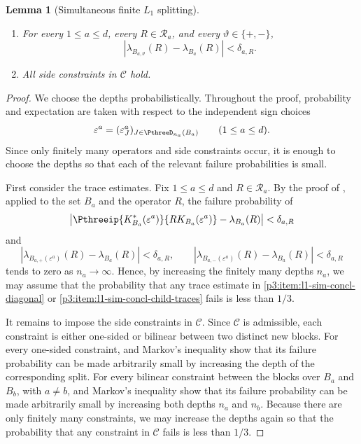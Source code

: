 \documentclass[11pt,reqno]{amsart}
\makeatletter
\theoremstyle{plain}
\newtheorem{lemma}[lemma]{Lemma}
\theoremstyle{definition}
\newcounter{problempaper}
\newenvironment{problempaperbody}{%
  \setcounter{subsection}{0}%
  \setcounter{subsubsection}{0}%
  \setcounter{paragraph}{0}%
  \renewcommand{\thesubsection}{\arabic{subsection}}%
  \renewcommand{\thesubsubsection}{\thesubsection.\arabic{subsubsection}}%
  \renewcommand{\theparagraph}{\thesubsubsection.\arabic{paragraph}}%
  \let\problem@outersection\section
  \let\problem@outersubsection\subsection
  \let\problem@outersubsubsection\subsubsection
  \let\problem@outerparagraph\paragraph
  \let\section\problem@papersection
  \let\subsection\problem@papersubsection
  \let\subsubsection\problem@papersubsubsection
}{%
  \let\section\problem@outersection
  \let\subsection\problem@outersubsection
  \let\subsubsection\problem@outersubsubsection
  \let\paragraph\problem@outerparagraph
}
\newcommand{\problem@target}[2]{%
  \hypertarget{problem-\theproblempaper-#1-#2}{}%
}
\newcommand{\problem@paperheading}[3]{%
  \par\bigskip
  \problem@target{#1}{#2}%
  \noindent{\large\bfseries #2.\quad #3\par}%
  \nobreak\smallskip
}
\newcommand{\problem@papersubheading}[3]{%
  \par\medskip
  \problem@target{#1}{#2}%
  \noindent{\normalsize\bfseries #2.\quad #3\par}%
  \nobreak\smallskip
}
\newcommand{\problem@papersubsubheading}[3]{%
  \par\smallskip
  \problem@target{#1}{#2}%
  \noindent{\normalsize\itshape #2.\quad #3.\ }%
}
\def\problem@papersection{%
  \@ifstar{\problem@papersectionstar}{\problem@papersectionnostar}%
}
\def\problem@papersectionstar#1{%
  \par\bigskip\noindent{\large\bfseries #1\par}\nobreak\smallskip
}
\def\problem@papersectionnostar#1{%
  \refstepcounter{subsection}%
  \setcounter{subsubsection}{0}%
  \setcounter{paragraph}{0}%
  \problem@paperheading{section}{\thesubsection}{#1}%
  \problem@writecontentsline{section}{\thesubsection}{#1}%
}
\def\problem@papersubsection{%
  \@ifstar{\problem@papersubsectionstar}{\problem@papersubsectionnostar}%
}
\def\problem@papersubsectionstar#1{%
  \par\medskip\noindent{\normalsize\bfseries #1\par}\nobreak\smallskip
}
\def\problem@papersubsectionnostar#1{%
  \refstepcounter{subsubsection}%
  \setcounter{paragraph}{0}%
  \problem@papersubheading{subsection}{\thesubsubsection}{#1}%
  \problem@writecontentsline{subsection}{\thesubsubsection}{#1}%
}
\def\problem@papersubsubsection{%
  \@ifstar{\problem@papersubsubsectionstar}{\problem@papersubsubsectionnostar}%
}
\def\problem@papersubsubsectionstar#1{%
  \par\smallskip\noindent{\normalsize\itshape #1.\ }%
}
\def\problem@papersubsubsectionnostar#1{%
  \refstepcounter{paragraph}%
  \problem@papersubsubheading{subsubsection}{\theparagraph}{#1}%
  \problem@writecontentsline{subsubsection}{\theparagraph}{#1}%
}
\newcommand{\problem@writecontentsline}[3]{%
  \begingroup
  \protected@write\@auxout{}{%
    \string\problemcontentsentry{\theproblempaper}{#1}{#2}{#3}{\thepage}%
  }%
  \endgroup
}
\newcommand{\problemcontentsentry}[5]{%
  \@ifundefined{problemcontents@#1}{%
    \expandafter\gdef\csname problemcontents@#1\endcsname{}%
  }{}%
  \expandafter\g@addto@macro\csname problemcontents@#1\endcsname{%
    \problemcontentsline{#1}{#2}{#3}{#4}{#5}%
  }%
}
\newcommand{\problemcontentslink}[4]{%
  \hyperlink{problem-#1-#2-#3}{#4}%
}
\newcommand{\problemcontentsline}[5]{%
  \ifstrequal{#2}{section}{%
    \par\noindent
    \problemcontentslink{#1}{#2}{#3}{\makebox[2.5em][l]{#3}#4}%
    \nobreak\dotfill
    \problemcontentslink{#1}{#2}{#3}{#5}\par
  }{%
    \ifstrequal{#2}{subsection}{%
      \par\noindent\hspace*{1.5em}%
      \problemcontentslink{#1}{#2}{#3}{\makebox[3.5em][l]{#3}#4}%
      \nobreak\dotfill
      \problemcontentslink{#1}{#2}{#3}{#5}\par
    }{%
      \par\noindent\hspace*{3em}%
      \problemcontentslink{#1}{#2}{#3}{\makebox[4.5em][l]{#3}#4}%
      \nobreak\dotfill
      \problemcontentslink{#1}{#2}{#3}{#5}\par
    }%
  }%
}
\makeatother
\begin{document}
\begin{problempaperbody}
\begin{lemma}[Simultaneous finite $L_1$ splitting]
\begin{enumerate}[label=\textup{(\roman*)}]
\item \label{p3:item:l1-sim-concl-child-traces} For every $1\leq a\leq d$, every $R\in\mathcal R_a$, and every $\vartheta\in\{+,-\}$,
\begin{equation*}
        |\lambda_{B_{a,\vartheta}}(R)-\lambda_{B_a}(R)|<\delta_{a,R}.
\end{equation*}

\item \label{p3:item:l1-sim-concl-side} All side constraints in $\mathscr C$ hold.
\end{enumerate}
\end{lemma}

\begin{proof}
We choose the depths probabilistically. Throughout the proof, probability and expectation are taken with respect to the independent sign choices
\begin{equation*}
        \varepsilon^a=(\varepsilon_J^a)_{J\in\PthreeD_{n_a}(B_a)}\qquad(1\leq a\leq d).
\end{equation*}
Since only finitely many operators and side constraints occur, it is enough to choose the depths so that each of the relevant failure probabilities is small.

First consider the trace estimates. Fix $1\leq a\leq d$ and $R\in\mathcal R_a$. By the proof of , applied to the set $B_a$ and the operator $R$, the failure probability of
\begin{equation*}
        \left|\Pthreeip{K_{B_a}^*(\varepsilon^a)}{RK_{B_a}(\varepsilon^a)}-\lambda_{B_a}(R)\right|<\delta_{a,R}
\end{equation*}
and
\begin{equation*}
        |\lambda_{B_{a,+}(\varepsilon^a)}(R)-\lambda_{B_a}(R)|<\delta_{a,R},\qquad |\lambda_{B_{a,-}(\varepsilon^a)}(R)-\lambda_{B_a}(R)|<\delta_{a,R}
\end{equation*}
tends to zero as $n_a\to\infty$. Hence, by increasing the finitely many depths $n_a$, we may assume that the probability that any trace estimate in \ref{p3:item:l1-sim-concl-diagonal} or \ref{p3:item:l1-sim-concl-child-traces} fails is less than $1/3$.

It remains to impose the side constraints in $\mathscr C$. Since $\mathscr C$ is admissible, each constraint is either one-sided or bilinear between two distinct new blocks. For every one-sided constraint,  and Markov's inequality show that its failure probability can be made arbitrarily small by increasing the depth of the corresponding split. For every bilinear constraint between the blocks over $B_a$ and $B_b$, with $a\ne b$,  and Markov's inequality show that its failure probability can be made arbitrarily small by increasing both depths $n_a$ and $n_b$. Because there are only finitely many constraints, we may increase the depths again so that the probability that any constraint in $\mathscr C$ fails is less than $1/3$.


\end{proof}
\end{problempaperbody}
\end{document}
